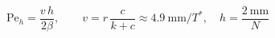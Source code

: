 \documentclass[border=4pt,varwidth=\maxdimen]{standalone}
\begin{document}
\fontsize{14}{20}\selectfont
$\mathrm{Pe}_h=\dfrac{v\,h}{2\beta},\qquad v=r\,\dfrac{c}{k+c}\approx 4.9\ \mathrm{mm}/T^*,\quad h=\dfrac{2\ \mathrm{mm}}{N}$
\end{document}
